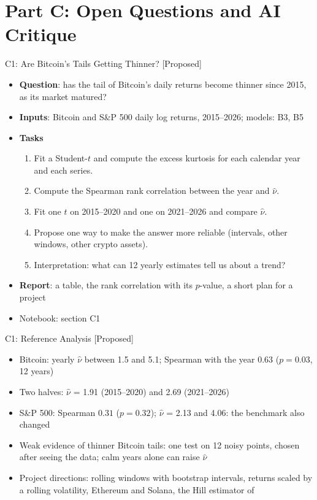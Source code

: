 \section{Part C: Open Questions and AI Critique}

\begin{frame}{C1: Are Bitcoin's Tails Getting Thinner? [Proposed]}
\itemsize{\footnotesize}
\begin{itemize}
\item \textbf{Question}: has the tail of Bitcoin's daily returns become thinner since 2015, as its market matured?
\item \textbf{Inputs}: Bitcoin and S\&P 500 daily log returns, 2015--2026; models: B3, B5
\item \textbf{Tasks}
\begin{enumerate}
    \item Fit a Student-$t$ and compute the excess kurtosis for each calendar year and each series.
    \item Compute the Spearman rank correlation between the year and $\hat\nu$.
    \item Fit one $t$ on 2015--2020 and one on 2021--2026 and compare $\hat\nu$.
    \item Propose one way to make the answer more reliable (intervals, other windows, other crypto assets).
    \item Interpretation: what can 12 yearly estimates tell us about a trend?
\end{enumerate}
\item \textbf{Report}: a table, the rank correlation with its $p$-value, a short plan for a project
\item Notebook: section C1
\end{itemize}
\end{frame}

\ifsolutions
\begin{frame}{C1: Reference Analysis [Proposed]}
\itemsize{\footnotesize}
\begin{itemize}
    \item Bitcoin: yearly $\hat\nu$ between 1.5 and 5.1; Spearman with the year $0.63$ ($p = 0.03$, 12 years)
    \item Two halves: $\hat\nu$ = 1.91 (2015--2020) and 2.69 (2021--2026)
    \item S\&P 500: Spearman $0.31$ ($p = 0.32$); $\hat\nu$ = 2.13 and 4.06: the benchmark also changed
    \item Weak evidence of thinner Bitcoin tails: one test on 12 noisy points, chosen after seeing the data; calm years alone can raise $\hat\nu$
    \item Project directions: rolling windows with bootstrap intervals, returns scaled by a rolling volatility, Ethereum and Solana, the Hill estimator of 
\end{itemize}
\end{frame}
\fi

